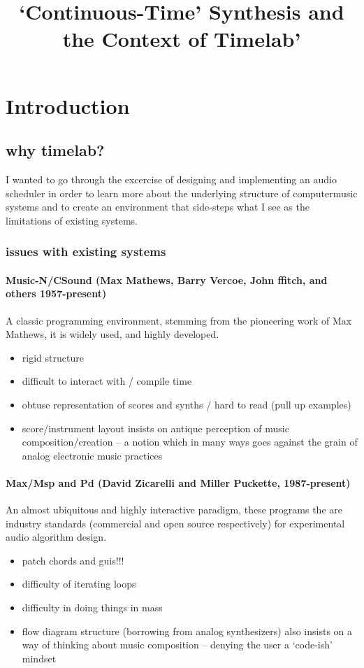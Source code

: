 \documentclass{article}
\begin{document}
\title{`Continuous-Time' Synthesis and the Context of Timelab'}
\maketitle
\section{Introduction}

\subsection{why timelab?}
I wanted to go through the excercise of designing and implementing an audio scheduler in order to learn more about the underlying structure of computermusic systems and to create an environment that side-steps what I see as the limitations of existing systems.
\subsubsection{issues with existing systems}

\paragraph{Music-N/CSound (Max Mathews, Barry Vercoe, John ffitch, and others 1957-present)}
A classic programming environment, stemming from the pioneering work of Max Mathews, it is  widely used, and highly developed.
\begin{itemize}
\item rigid structure 
\item difficult to interact with / compile time
\item obtuse representation of scores and synths / hard to read (pull up examples)
\item score/instrument layout insists on antique perception of music composition/creation -- a notion which in many ways goes against the grain of analog electronic music practices 
\end{itemize} 

\paragraph{Max/Msp and Pd (David Zicarelli and Miller Puckette, 1987-present)}
An almost ubiquitous and highly interactive paradigm, these programs the are industry standards (commercial and open source respectively) for experimental audio algorithm design.
\begin{itemize}
\item patch chords and guis!!!%
\item difficulty of iterating loops%
\item difficulty in doing things in mass
\item flow diagram structure (borrowing from analog synthesizers) also insists on a way of thinking about music composition -- denying the user a `code-ish' mindset
\end{itemize}
\end{document}
